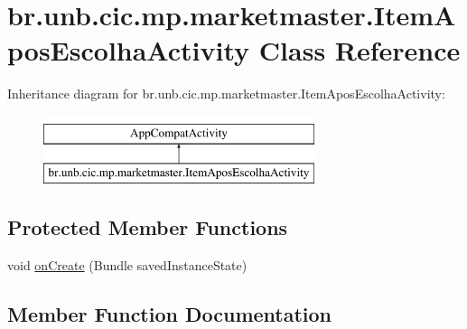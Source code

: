 \hypertarget{classbr_1_1unb_1_1cic_1_1mp_1_1marketmaster_1_1ItemAposEscolhaActivity}{}\section{br.\+unb.\+cic.\+mp.\+marketmaster.\+Item\+Apos\+Escolha\+Activity Class Reference}
\label{classbr_1_1unb_1_1cic_1_1mp_1_1marketmaster_1_1ItemAposEscolhaActivity}
Inheritance diagram for br.\+unb.\+cic.\+mp.\+marketmaster.\+Item\+Apos\+Escolha\+Activity\+:\begin{figure}[H]
\begin{center}
\leavevmode
\includegraphics[height=2.000000cm]{classbr_1_1unb_1_1cic_1_1mp_1_1marketmaster_1_1ItemAposEscolhaActivity}
\end{center}
\end{figure}
\subsection*{Protected Member Functions}
\begin{DoxyCompactItemize}
\item 
void \mbox{\hyperlink{classbr_1_1unb_1_1cic_1_1mp_1_1marketmaster_1_1ItemAposEscolhaActivity_ad2bf4a1b8ad05c16deeb8fbccda15859}{on\+Create}} (Bundle saved\+Instance\+State)
\end{DoxyCompactItemize}


\subsection{Member Function Documentation}
\mbox{\label{classbr_1_1unb_1_1cic_1_1mp_1_1marketmaster_1_1ItemAposEscolhaActivity_ad2bf4a1b8ad05c16deeb8fbccda15859}} 
